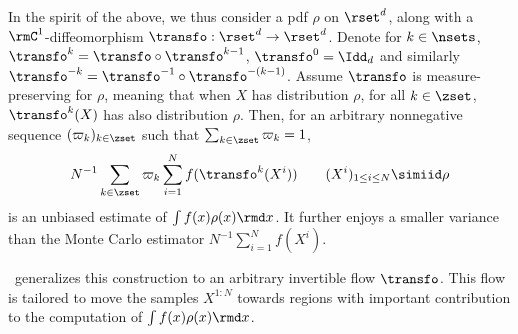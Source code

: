 In the spirit of the above, we thus consider a pdf $\rho$ on $\rset^{d}$, along with a $\rmC^1$-diffeomorphism
$\transfo:\rset^{d}\to \rset^{d}$. 
Denote for $k \in \nsets$, $\transfo^{k}=\transfo\circ\transfo^{k-1}$, $\transfo^{0}=\Idd_{d}$ and similarly $\transfo^{-k}=\transfo^{-1}\circ\transfo^{-(k-1)}$. 
Assume $\transfo$ is measure-preserving for $\rho$, 
meaning that when $X$ has distribution $\rho$, for all $k\in \zset$, $\transfo^k(X)$ has also distribution $\rho$. Then,
for an arbitrary nonnegative sequence $(\varpi_k)_{k \in\zset}$ such that 
$\sum_{k\in \zset} \varpi_k=1$, %
$$N^{-1} \sum_{k\in \zset} \varpi_k\sum_{i=1}^N  f(\transfo^k(X^i))\qquad(X^i)_{1\le i\le N}\simiid\rho$$ is an unbiased estimate of $\int f(x) \rho(x) \rmd x$. It further enjoys a smaller variance
than the Monte Carlo estimator $N^{-1} \sum_{i=1}^Nf(X^i)$.  

\IFIS\ generalizes
this construction to an arbitrary invertible flow
$\transfo$. This flow is tailored to move the samples $X^{1:N}$ towards regions with important contribution to the computation of
$\int f(x) \rho(x) \rmd x$.




